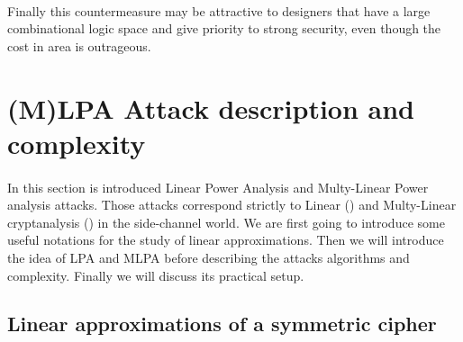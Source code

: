 \documentclass[11pt,a4paper]{article}
\begin{document}
{{{{{{{\paragraph{}
Finally this countermeasure may be attractive to designers that have a large combinational logic space and give priority to strong security, even though the cost in area is outrageous. 

\section{(M)LPA Attack description and complexity}
\paragraph{}
In this section is introduced Linear Power Analysis and Multy-Linear Power analysis attacks. Those attacks correspond strictly to Linear (\cite{Matsui93}) and Multy-Linear cryptanalysis 
(\cite{KaliskiRobshaw94}) in the side-channel world. We are first going to introduce some useful notations for the study of linear approximations. Then we will introduce the idea of LPA and MLPA 
before describing the attacks algorithms and complexity. Finally we will discuss its practical setup. 
\subsection{Linear approximations of a symmetric cipher}
\label{subsec:linearapprox}
}}}}}}}
\end{document}
